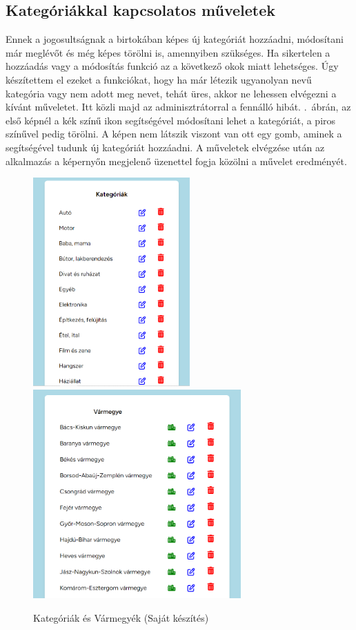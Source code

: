 \documentclass[]{thesis-ekf}
\theoremstyle{definition}
\theoremstyle{remark}
\begin{document}
	\subsection{Kategóriákkal kapcsolatos műveletek}\label{sc-kategoria}
		Ennek a jogosultságnak a birtokában képes új kategóriát hozzáadni, módosítani már meglévőt és még képes törölni is, amennyiben szükséges. Ha sikertelen a hozzáadás vagy a módosítás funkció az a következő okok miatt lehetséges. Úgy készítettem el ezeket a funkciókat, hogy ha már létezik ugyanolyan nevű kategória vagy nem adott meg nevet, tehát üres, akkor ne lehessen elvégezni a kívánt műveletet. Itt közli majd az adminisztrátorral a fennálló hibát. .~ábrán, az első képnél a kék színű ikon segítségével módosítani lehet a kategóriát, a piros színűvel pedig törölni. A képen nem látszik viszont van ott egy gomb, aminek a segítségével tudunk új kategóriát hozzáadni. A műveletek elvégzése után az alkalmazás a képernyőn megjelenő üzenettel fogja közölni a művelet eredményét.
		\begin{figure}[ht!]
			\centering
			\includegraphics[height=8cm]{./felhasznaloi/kategoria}
			\includegraphics[height=8cm]{./felhasznaloi/varmegye}
			\caption{Kategóriák és Vármegyék (Saját készítés)} 
			\label{kategoria-muveletek}
			\label{varmegye-varos-muvelet}
		\end{figure} 
\end{document}
